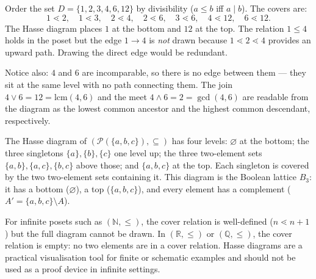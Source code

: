 \begin{example*}[Divisibility on $\{1,2,3,4,6,12\}$]
\label{ex:hasse-divisibility}
Order the set $D = \{1, 2, 3, 4, 6, 12\}$ by divisibility ($a \leq b$ iff
$a \mid b$).  The covers are:
\[
  1 \lessdot 2,\quad
  1 \lessdot 3,\quad
  2 \lessdot 4,\quad
  2 \lessdot 6,\quad
  3 \lessdot 6,\quad
  4 \lessdot 12,\quad
  6 \lessdot 12.
\]
The Hasse diagram places $1$ at the bottom and $12$ at the top.  The relation
$1 \leq 4$ holds in the poset but the edge $1 \to 4$ is \emph{not} drawn
because $1 \lessdot 2 \lessdot 4$ provides an upward path.  Drawing the direct
edge would be redundant.

Notice also: $4$ and $6$ are incomparable, so there is no edge between them —
they sit at the same level with no path connecting them.  The join
$4 \vee 6 = 12 = \mathrm{lcm}(4,6)$ and the meet $4 \wedge 6 = 2 = \gcd(4,6)$
are readable from the diagram as the lowest common ancestor and the highest
common descendant, respectively.
\end{example*}

\begin{example*}
\label{ex:hasse-power-set}
The Hasse diagram of $(\mathcal{P}(\{a,b,c\}), \subseteq)$ has four levels:
$\varnothing$ at the bottom; the three singletons $\{a\},\{b\},\{c\}$ one
level up; the three two-element sets $\{a,b\},\{a,c\},\{b,c\}$ above those;
and $\{a,b,c\}$ at the top.  Each singleton is covered by the two two-element
sets containing it.  This diagram is the Boolean lattice $B_3$: it has a
bottom ($\varnothing$), a top ($\{a,b,c\}$), and every element has a complement
($A' = \{a,b,c\} \setminus A$).
\end{example*}

\begin{remark*}
\label{rem:hasse-infinite}
For infinite posets such as $(\mathbb{N}, \leq)$, the cover relation is
well-defined ($n \lessdot n+1$) but the full diagram cannot be drawn.  In
$(\mathbb{R}, \leq)$ or $(\mathbb{Q}, \leq)$, the cover relation is empty:
no two elements are in a cover relation.  Hasse diagrams are a practical
visualisation tool for finite or schematic examples and should not be used
as a proof device in infinite settings.
\end{remark*}


